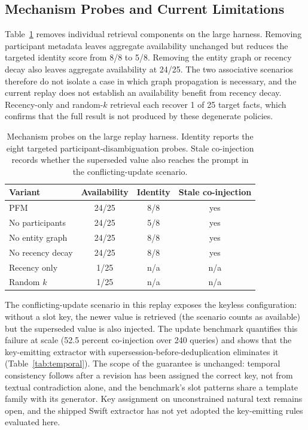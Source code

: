 \documentclass[letterpaper]{article} %
\begin{document}
\subsection{Mechanism Probes and Current Limitations}

Table~\ref{tab:ablation} removes individual retrieval components on the large harness. Removing participant metadata leaves aggregate availability unchanged but reduces the targeted identity score from 8/8 to 5/8. Removing the entity graph or recency decay also leaves aggregate availability at 24/25. The two associative scenarios therefore do not isolate a case in which graph propagation is necessary, and the current replay does not establish an availability benefit from recency decay. Recency-only and random-$k$ retrieval each recover 1 of 25 target facts, which confirms that the full result is not produced by these degenerate policies.

\begin{table}[t]
\centering
\small
\begin{tabular}{@{}lccc@{}}
\toprule
Variant & Availability & Identity & Stale co-injection \\
\midrule
PFM & 24/25 & 8/8 & yes \\
No participants & 24/25 & 5/8 & yes \\
No entity graph & 24/25 & 8/8 & yes \\
No recency decay & 24/25 & 8/8 & yes \\
Recency only & 1/25 & n/a & n/a \\
Random $k$ & 1/25 & n/a & n/a \\
\bottomrule
\end{tabular}
\caption{Mechanism probes on the large replay harness. Identity reports the eight targeted participant-disambiguation probes. Stale co-injection records whether the superseded value also reaches the prompt in the conflicting-update scenario.}
\label{tab:ablation}
\end{table}

The conflicting-update scenario in this replay exposes the keyless configuration: without a slot key, the newer value is retrieved (the scenario counts as available) but the superseded value is also injected. The update benchmark quantifies this failure at scale (52.5 percent co-injection over 240 queries) and shows that the key-emitting extractor with supersession-before-deduplication eliminates it (Table~\ref{tab:temporal}). The scope of the guarantee is unchanged: temporal consistency follows after a revision has been assigned the correct key, not from textual contradiction alone, and the benchmark's slot patterns share a template family with its generator. Key assignment on unconstrained natural text remains open, and the shipped Swift extractor has not yet adopted the key-emitting rules evaluated here.
\end{document}
